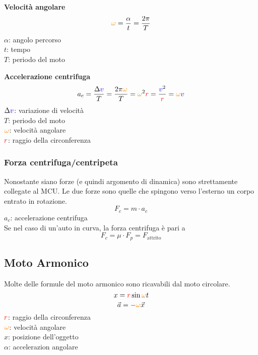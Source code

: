 \textbf{Velocità angolare}
\begin{equation*}
\mathcolor{orange}{\omega} = \frac{\alpha}{t} = \frac{2\pi}{T}
\end{equation*}
$\alpha$: angolo percorso\\ 
$t$: tempo\\
$T$: periodo del moto

\textbf{Accelerazione centrifuga}
\begin{equation*}
a_c = \frac{\Delta \mathcolor{blue}{v}}{T} = \frac{2\pi\mathcolor{orange}{\omega}}{T} = 
\mathcolor{orange}{\omega}^2\mathcolor{red}{r} = \frac{\mathcolor{blue}{v}^2}{\mathcolor{red}{r}} = 
\mathcolor{orange}{\omega}\mathcolor{blue}{v}
\end{equation*}
$\Delta\mathcolor{blue}{v}$: variazione di velocità\\
$T$: periodo del moto\\
$\mathcolor{orange}{\omega}$: velocità angolare\\
$\mathcolor{red}{r}$: raggio della circonferenza

\subsubsection{Forza centrifuga/centripeta}
Nonostante siano forze (e quindi argomento di dinamica) sono strettamente collegate al MCU. Le due 
forze sono quelle che spingono verso l'esterno un corpo entrato in rotazione.
\begin{equation*}
F_c = m\cdot a_c
\end{equation*}
$a_c$: accelerazione centrifuga\\[\baselineskip]
Se nel caso di un'auto in curva, la forza centrifuga è pari a
\begin{equation*}
F_c = \mu\cdot F_p = F_{\text{attrito}}
\end{equation*}

\subsection{Moto Armonico}
Molte delle formule del moto armonico sono ricavabili dal moto circolare.
\begin{equation*}
x = \mathcolor{red}{r}\sin\mathcolor{orange}{\omega}t
\end{equation*}
\begin{equation*}
\vec{a} = -\mathcolor{orange}{\omega}\vec{x}
\end{equation*}
$\mathcolor{red}{r}$: raggio della circonferenza\\
$\mathcolor{orange}{\omega}$: velocità angolare\\
$x$: posizione dell'oggetto\\
$\alpha$: accelerazion angolare

